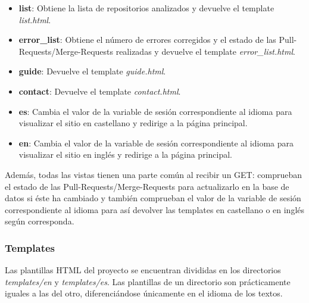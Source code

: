 \documentclass[a4paper, 12pt]{book}
\begin{document}
\begin{itemize}
\begin{itemize}
	\end{itemize}
	\item \textbf{list}: Obtiene la lista de repositorios analizados y devuelve el template \textit{list.html}. 
	\item \textbf{error\_list}: Obtiene el número de errores corregidos y el estado de las Pull-Requests/Merge-Requests realizadas y  devuelve el template \textit{error\_list.html}.
	\item \textbf{guide}: Devuelve el template \textit{guide.html}.
	\item \textbf{contact}: Devuelve el template \textit{contact.html}.
	\item \textbf{es}: Cambia el valor de la variable de sesión correspondiente al idioma para visualizar el sitio en castellano y redirige a la página principal.
	\item \textbf{en}: Cambia el valor de la variable de sesión correspondiente al idioma para visualizar el sitio en inglés y redirige a la página principal.
\end{itemize}
Además, todas las vistas tienen una parte común al recibir un GET: comprueban el estado de las Pull-Requests/Merge-Requests para actualizarlo en la base de datos si éste ha cambiado y también comprueban el valor de la variable de sesión correspondiente al idioma para así devolver las templates en castellano o en inglés según corresponda.

\subsubsection{Templates}
\label{subsubsec:django_templates}
Las plantillas HTML del proyecto se encuentran divididas en los directorios \textit{templates/en} y \textit{templates/es}. Las plantillas de un directorio son prácticamente iguales a las del otro, diferenciándose únicamente en el idioma de los textos.
\end{document}
